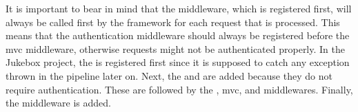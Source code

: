 It is important to bear in mind that the middleware, which is registered first, will always be called first by the framework for each request that is processed. This means that the authentication middleware should always be registered before the \gls{mvc} middleware, otherwise requests might not be authenticated properly. In the Jukebox project, the  is registered first since it is supposed to catch any exception thrown in the pipeline later on. Next, the  and  are added because they do not require authentication. These are followed by the , \gls{mvc}, and  middlewares. Finally, the  middleware is added.



